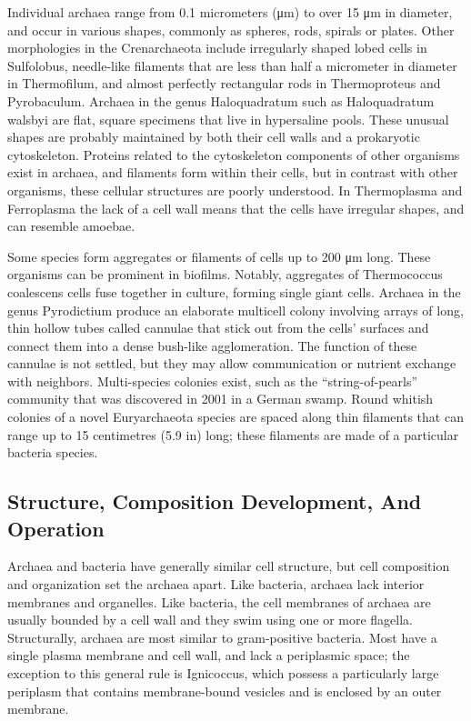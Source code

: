 Individual archaea range from 0.1 micrometers (μm) to over 15 μm in diameter, and occur in various shapes, commonly as spheres, rods, spirals or plates. Other morphologies in the Crenarchaeota include irregularly shaped lobed cells in Sulfolobus, needle-like filaments that are less than half a micrometer in diameter in Thermofilum, and almost perfectly rectangular rods in Thermoproteus and Pyrobaculum. Archaea in the genus Haloquadratum such as Haloquadratum walsbyi are flat, square specimens that live in hypersaline pools. These unusual shapes are probably maintained by both their cell walls and a prokaryotic cytoskeleton. Proteins related to the cytoskeleton components of other organisms exist in archaea, and filaments form within their cells, but in contrast with other organisms, these cellular structures are poorly understood. In Thermoplasma and Ferroplasma the lack of a cell wall means that the cells have irregular shapes, and can resemble amoebae.

Some species form aggregates or filaments of cells up to 200 μm long. These organisms can be prominent in biofilms. Notably, aggregates of Thermococcus coalescens cells fuse together in culture, forming single giant cells. Archaea in the genus Pyrodictium produce an elaborate multicell colony involving arrays of long, thin hollow tubes called cannulae that stick out from the cells' surfaces and connect them into a dense bush-like agglomeration. The function of these cannulae is not settled, but they may allow communication or nutrient exchange with neighbors. Multi-species colonies exist, such as the ``string-of-pearls'' community that was discovered in 2001 in a German swamp. Round whitish colonies of a novel Euryarchaeota species are spaced along thin filaments that can range up to 15 centimetres (5.9 in) long; these filaments are made of a particular bacteria species.

\hypertarget{structure-composition-development-and-operation}{%
\subsection{Structure, Composition Development, And Operation}\label{structure-composition-development-and-operation}}

Archaea and bacteria have generally similar cell structure, but cell composition and organization set the archaea apart. Like bacteria, archaea lack interior membranes and organelles. Like bacteria, the cell membranes of archaea are usually bounded by a cell wall and they swim using one or more flagella. Structurally, archaea are most similar to gram-positive bacteria. Most have a single plasma membrane and cell wall, and lack a periplasmic space; the exception to this general rule is Ignicoccus, which possess a particularly large periplasm that contains membrane-bound vesicles and is enclosed by an outer membrane.

